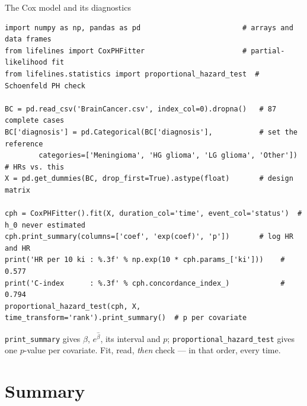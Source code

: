 \documentclass[aspectratio=169,11pt]{beamer}
\begin{document}
\begin{frame}[fragile]{The Cox model and its diagnostics}
  \begin{lstlisting}[basicstyle=\ttfamily\scriptsize]
import numpy as np, pandas as pd                        # arrays and data frames
from lifelines import CoxPHFitter                       # partial-likelihood fit
from lifelines.statistics import proportional_hazard_test  # Schoenfeld PH check

BC = pd.read_csv('BrainCancer.csv', index_col=0).dropna()   # 87 complete cases
BC['diagnosis'] = pd.Categorical(BC['diagnosis'],           # set the reference
        categories=['Meningioma', 'HG glioma', 'LG glioma', 'Other'])  # HRs vs. this
X = pd.get_dummies(BC, drop_first=True).astype(float)       # design matrix

cph = CoxPHFitter().fit(X, duration_col='time', event_col='status')  # h_0 never estimated
cph.print_summary(columns=['coef', 'exp(coef)', 'p'])       # log HR and HR
print('HR per 10 ki : %.3f' % np.exp(10 * cph.params_['ki']))    # 0.577
print('C-index      : %.3f' % cph.concordance_index_)            # 0.794
proportional_hazard_test(cph, X, time_transform='rank').print_summary()  # p per covariate
  \end{lstlisting}
  \begin{takeaway}
    \texttt{print\_summary} gives $\hat\beta$, $e^{\hat\beta}$, its interval and $p$;
    \texttt{proportional\_hazard\_test} gives one $p$-value per covariate. Fit, read,
    \emph{then} check --- in that order, every time.
  \end{takeaway}
\end{frame}

\section{Summary}
\end{document}
